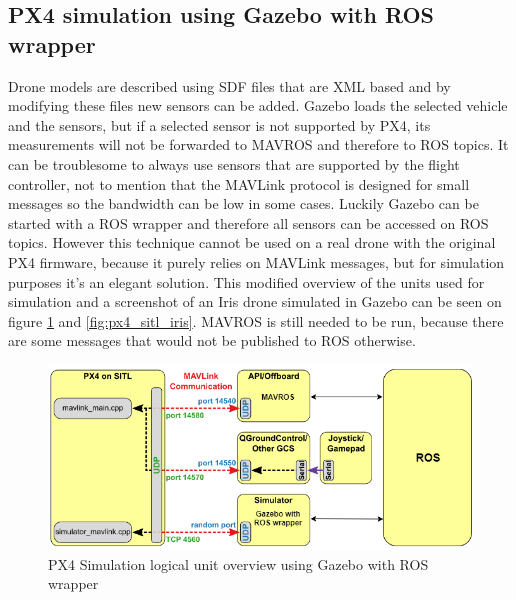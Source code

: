 \subsection{PX4 simulation using Gazebo with ROS wrapper}

Drone models are described using SDF files that are XML based and by modifying these files new sensors can 
be added. Gazebo loads the selected vehicle and the sensors, but if a selected sensor is not supported by
PX4, its measurements will not be forwarded to MAVROS and therefore to ROS topics. It can be troublesome 
to always use sensors that are supported by the flight controller, not to mention that the MAVLink protocol 
is designed for small messages so the bandwidth can be low in some cases. Luckily Gazebo can 
be started with a ROS wrapper and therefore all sensors can be accessed on ROS topics. However this technique
cannot be used on a real drone with the original PX4 firmware, because it purely relies on MAVLink messages, 
but for simulation purposes it's an elegant solution. This modified overview of the units used for simulation
and a screenshot of an Iris drone simulated in Gazebo can be seen on figure \ref{fig:px4_sitl_ros_wrapper} and 
\ref{fig:px4_sitl_iris}. 
MAVROS is still needed to be run, because there are some messages that would not be published to ROS otherwise.

\begin{figure}[h]
    \centering
    \includegraphics[width=140mm, keepaspectratio]{figures/px4_sitl_with_ros.png}
    \caption{PX4 Simulation logical unit overview using Gazebo with ROS wrapper}
    \label{fig:px4_sitl_ros_wrapper}
\end{figure}

